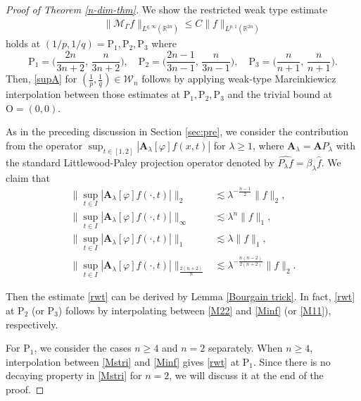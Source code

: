 \documentclass[10pt] %
{amsart}
\theoremstyle{plain}
\numberwithin{equation}{section}
\begin{document}
\begin{proof}[Proof of Theorem \ref{n-dim-thm}]
We show the restricted weak type estimate  
\begin{align}\label{rwt} \big\| \mathcal M_\Gamma f \big\|_{L^{q,\infty}(\mathbb R^{2n})} \le  C\|f\|_{L^{p,1}(\mathbb R^{2n})}  \end{align}
holds at 
$(1/p,1/q) = \mathrm P_1, \mathrm P_2, \mathrm P_3$ where
\[
\mathrm P_1 =\Big(\frac{2n}{3n+2},\,\frac n{3n+2}\Big), \quad
\mathrm P_2 = \Big(\frac{2n-1}{3n-1},\,\frac{n}{3n-1}\Big),\quad
\mathrm P_3 = \Big(\frac n{n+1},\, \frac {n}{n+1}\Big).
\]
Then, \eqref{supA} for $(\frac1p,\frac1q)\in \mathcal W_n$ follows by applying weak-type Marcinkiewicz interpolation between those estimates at $\mathrm P_1, \mathrm P_2, \mathrm P_3$ and the trivial bound at $\mathrm O=(0,0)$. 

 

As in the preceding discussion in Section \ref{sec:pre}, we consider the contribution from the operator $\sup_{t\in [1,2]}|\mathbf A_\lambda [\varphi]   f(x,t)|$ for $\lambda \ge 1$, where $\mathbf A_\lambda = \mathbf A P_\lambda$ with the standard Littlewood-Paley projection operator denoted by $\widehat{P_\lambda  f} =\beta_\lambda \widehat f$. 
We claim that 
\begin{align}
\big\| \sup_{t\in I} |\mathbf A_\lambda[\varphi] f (\cdot ,t) | \big\|_2 &\lesssim \lambda^{-\frac {n-1}2}\|f\|_2, \label{M22}\\
\big\| \sup_{t\in I} |\mathbf A_\lambda[\varphi] f (\cdot ,t)| \big\|_{\infty} &\lesssim \lambda^n\|f\|_1, \label{Minf}\\
\big\| \sup_{t\in I} |\mathbf A_\lambda[\varphi] f (\cdot ,t)|\big\|_1 &\lesssim \lambda \|f\|_1, \label{M11}\\
\big\| \sup_{t\in I} |\mathbf A_\lambda[\varphi] f (\cdot ,t)| \big\|_{\frac{2(n+2)}{n}} &\lesssim 
\lambda^{-\frac{n(n-2)}{2(n+2)}}\|f\|_2. \label{Mstri}
\end{align}

Then the estimate \eqref{rwt} can be derived by Lemma \ref{Bourgain trick}. In fact, \eqref{rwt} at $\mathrm P_2$ (or $\mathrm P_3$) follows by interpolating between \eqref{M22} and \eqref{Minf} (or \eqref{M11}), respectively. 



For $\mathrm P_1$, we consider the cases $n\ge 4$ and $n=2$ separately. 
When $n\ge 4$, interpolation between \eqref{Mstri} and \eqref{Minf} gives  \eqref{rwt} at $\mathrm P_1$.
Since there is no decaying property in \eqref{Mstri} for $n=2$, we will discuss it at the end of the proof. 
 





\end{proof}
\end{document}
